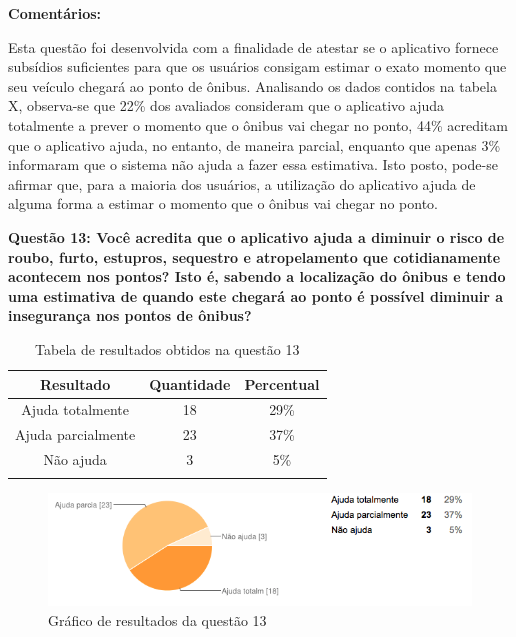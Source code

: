 \textbf{Comentários:}

Esta questão foi desenvolvida com a finalidade de atestar se o aplicativo fornece subsídios suficientes para que os usuários consigam estimar o exato momento que seu veículo chegará ao ponto de ônibus. 
Analisando os dados contidos na tabela X, observa-se que 22\% dos avaliados consideram que o aplicativo ajuda totalmente a prever o momento que o ônibus vai chegar no ponto, 44\% acreditam que o aplicativo ajuda, no entanto, de maneira parcial, enquanto que apenas 3\% informaram que o sistema não ajuda a fazer essa estimativa. Isto posto, pode-se afirmar que, para a maioria dos usuários, a utilização do aplicativo ajuda de alguma forma a estimar o momento que o ônibus vai chegar no ponto.\newline

\textbf{Questão 13: Você acredita que o aplicativo ajuda a diminuir o risco de roubo, furto, estupros, sequestro e atropelamento que cotidianamente acontecem nos pontos? Isto é, sabendo a localização do ônibus e tendo uma estimativa de quando este chegará ao ponto é possível diminuir a insegurança nos pontos de ônibus? }

\begin{center}
\begin{longtable}{c|c|c}
\hline
    \multicolumn{1}{c}{\textbf{Resultado}} & \multicolumn{1}{c}{\textbf{Quantidade}} & \multicolumn{1}{c}{\textbf{Percentual}} \\
\hline
    Ajuda totalmente & 18 &  29\%\\
    \hline
    Ajuda parcialmente & 23 & 37\%\\
    \hline
    Não ajuda & 3 &  5\%\\
    \hline

\caption{Tabela de resultados obtidos na questão 13}
\label{tabq13}
\end{longtable}
\end{center}


\begin{figure}[h]
\begin{center}
  \includegraphics[width=16cm]{images/graficos/questao13.png}
  \caption{Gráfico de resultados da questão 13}
  \label{fig:questao13}
\end{center}
\end{figure}

